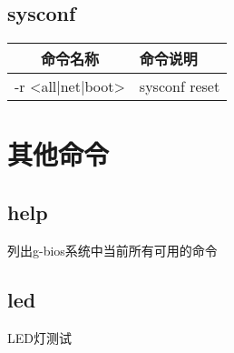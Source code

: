 \subsection{sysconf}
\begin{table}[H]
\begin{tabular}{|c|l|}
\hline
命令名称 & 命令说明\\ \hline
-r <all|net|boot> & sysconf reset \\ \hline
\end{tabular}
\end{table}

\section{其他命令}
\subsection{help}
列出g-bios系统中当前所有可用的命令

\subsection{led}
LED灯测试
